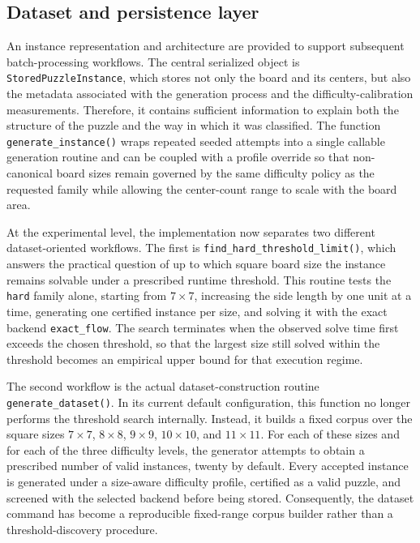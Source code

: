 \subsection{Dataset and persistence layer}
An instance representation and architecture are provided to support subsequent
batch-processing workflows. The central serialized object is
\texttt{StoredPuzzleInstance}, which stores not only the board and its centers,
but also the metadata associated with the generation process and the
difficulty-calibration measurements. Therefore, it contains sufficient
information to explain both the structure of the puzzle and the way in which it
was classified. The function \texttt{generate\_instance()} wraps repeated seeded
attempts into a single callable generation routine and can be coupled with a
profile override so that non-canonical board sizes remain governed by the same
difficulty policy as the requested family while allowing the center-count range
to scale with the board area.

At the experimental level, the implementation now separates two different
dataset-oriented workflows. The first is \texttt{find\_hard\_threshold\_limit()},
which answers the practical question of up to which square board size the
instance remains solvable under a prescribed runtime threshold. This routine
tests the \texttt{hard} family alone, starting from \(7\times 7\), increasing
the side length by one unit at a time, generating one certified instance per
size, and solving it with the exact backend \texttt{exact\_flow}. The search
terminates when the observed solve time first exceeds the chosen threshold, so
that the largest size still solved within the threshold becomes an empirical
upper bound for that execution regime.

The second workflow is the actual dataset-construction routine
\texttt{generate\_dataset()}. In its current default configuration, this
function no longer performs the threshold search internally. Instead, it builds
a fixed corpus over the square sizes \(7\times 7\), \(8\times 8\),
\(9\times 9\), \(10\times 10\), and \(11\times 11\). For each of these sizes
and for each of the three difficulty levels, the generator attempts to obtain a
prescribed number of valid instances, twenty by default. Every accepted
instance is generated under a size-aware difficulty profile, certified as a
valid puzzle, and screened with the selected backend before being stored.
Consequently, the dataset command has become a reproducible fixed-range corpus
builder rather than a threshold-discovery procedure.

